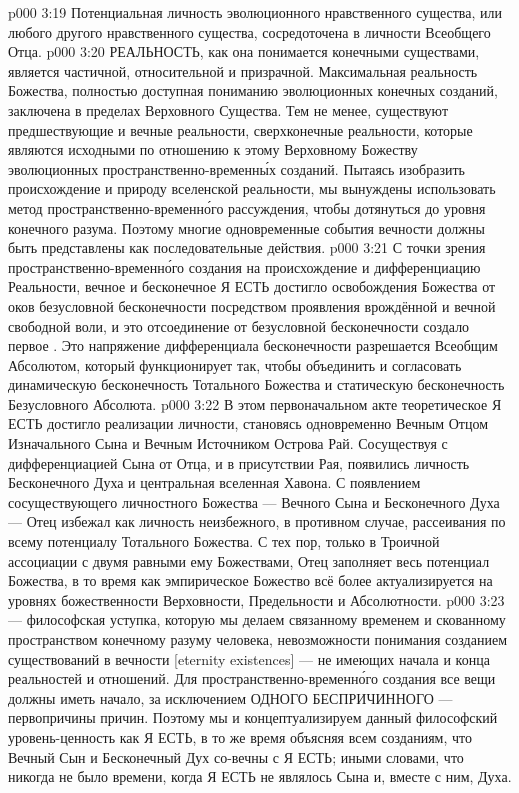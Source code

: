 \vs p000 3:19 \bibnobreakspace Потенциальная личность эволюционного нравственного существа, или любого другого нравственного существа, сосредоточена в личности Всеобщего Отца.
\vs p000 3:20 \pc РЕАЛЬНОСТЬ, как она понимается конечными существами, является частичной, относительной и призрачной. Максимальная реальность Божества, полностью доступная пониманию эволюционных конечных созданий, заключена в пределах Верховного Существа. Тем не менее, существуют предшествующие и вечные реальности, сверхконечные реальности, которые являются исходными по отношению к этому Верховному Божеству эволюционных пространственно\hyp{}временн\'ых созданий. Пытаясь изобразить происхождение и природу вселенской реальности, мы вынуждены использовать метод пространственно\hyp{}временн\'ого рассуждения, чтобы дотянуться до уровня конечного разума. Поэтому многие одновременные события вечности должны быть представлены как последовательные действия.
\vs p000 3:21 С точки зрения пространственно\hyp{}временн\'ого создания на происхождение и дифференциацию Реальности, вечное и бесконечное Я ЕСТЬ достигло освобождения Божества от оков безусловной бесконечности посредством проявления врождённой и вечной свободной воли, и это отсоединение от безусловной бесконечности создало первое . Это напряжение дифференциала бесконечности разрешается Всеобщим Абсолютом, который функционирует так, чтобы объединить и согласовать динамическую бесконечность Тотального Божества и статическую бесконечность Безусловного Абсолюта.
\vs p000 3:22 В этом первоначальном акте теоретическое Я ЕСТЬ достигло реализации личности, становясь одновременно Вечным Отцом Изначального Сына и Вечным Источником Острова Рай. Сосуществуя с дифференциацией Сына от Отца, и в присутствии Рая, появились личность Бесконечного Духа и центральная вселенная Хавона. С появлением сосуществующего личностного Божества --- Вечного Сына и Бесконечного Духа --- Отец избежал как личность неизбежного, в противном случае, рассеивания по всему потенциалу Тотального Божества. С тех пор, только в Троичной ассоциации с двумя равными ему Божествами, Отец заполняет весь потенциал Божества, в то время как эмпирическое Божество всё более актуализируется на уровнях божественности Верховности, Предельности и Абсолютности.
\vs p000 3:23 \pc {} --- философская уступка, которую мы делаем связанному временем и скованному пространством конечному разуму человека, невозможности понимания созданием существований в вечности [eternity existences] --- не имеющих начала и конца реальностей и отношений. Для пространственно\hyp{}временн\'ого создания все вещи должны иметь начало, за исключением ОДНОГО БЕСПРИЧИННОГО --- первопричины причин. Поэтому мы и концептуализируем данный философский уровень\hyp{}ценность как Я ЕСТЬ, в то же время объясняя всем созданиям, что Вечный Сын и Бесконечный Дух со\hyp{}вечны с Я ЕСТЬ; иными словами, что никогда не было времени, когда Я ЕСТЬ не являлось  Сына и, вместе с ним, Духа.
